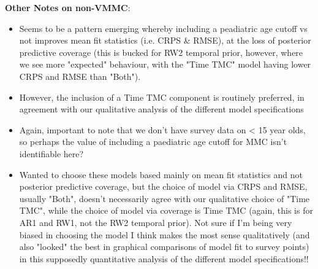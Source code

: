 \documentclass{article}
\begin{document}
\textbf{Other Notes on non-VMMC}:
\begin{itemize}
    \item Seems to be a pattern emerging whereby including a peadiatric age cutoff vs not improves mean fit statistics (i.e. CRPS \& RMSE), at the loss of posterior predictive coverage (this is bucked for RW2 temporal prior, however, where we see more "expected" behaviour, with the "Time TMC" model having lower CRPS and RMSE than "Both"). 
    \item However, the inclusion of a Time TMC component is routinely preferred, in agreement with our qualitative analysis of the different model specifications 
    \item Again, important to note that we don't have survey data on < 15 year olds, so perhaps the value of including a paediatric age cutoff for MMC isn't identifiable here?
    \item Wanted to choose these models based mainly on mean fit statistics and not posterior predictive coverage, but the choice of model via CRPS and RMSE, usually "Both", doesn't necessarily agree with our qualitative choice of "Time TMC", while the choice of model via coverage is Time TMC (again, this is for AR1 and RW1, not the RW2 temporal prior). Not sure if I'm being very biased in choosing the model I think makes the most sense qualitatively (and also "looked" the best in graphical comparisons of model fit to survey points) in this supposedly quantitative analysis of the different model specifications!!

\end{itemize}
\end{document}
